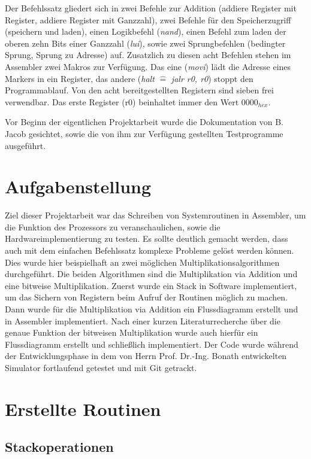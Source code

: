 \documentclass[fleqn, a4paper, 1pt]{article}       %
\begin{document}
Der Befehlssatz gliedert sich in zwei Befehle zur Addition (addiere Register mit Register, addiere Register mit Ganzzahl), zwei Befehle für den Speicherzugriff (speichern und laden), einen Logikbefehl (\emph{nand}), einen Befehl zum laden der oberen zehn Bits einer Ganzzahl (\emph{lui}), sowie zwei Sprungbefehlen (bedingter Sprung, Sprung zu Adresse) auf. Zusatzlich zu diesen acht Befehlen stehen im Assembler zwei Makros zur Verfügung. Das eine (\emph{movi}) lädt die Adresse eines Markers in ein Register, das andere (\emph{halt} $\widehat{=}$ \emph{jalr r0, r0}) stoppt den Programmablauf. Von den acht bereitgestellten Registern sind sieben frei verwendbar. Das erste Register (r0) beinhaltet immer den Wert $0000_{hex}$.

Vor Beginn der eigentlichen Projektarbeit wurde die Dokumentation von B. Jacob gesichtet, sowie die von ihm zur Verfügung gestellten Testprogramme ausgeführt.


\section{Aufgabenstellung}
Ziel dieser Projektarbeit war das Schreiben von Systemroutinen in Assembler, um die Funktion des Prozessors zu veranschaulichen, sowie die Hardwareimplementierung zu testen. Es sollte deutlich gemacht werden, dass auch mit dem einfachen Befehlssatz komplexe Probleme gelöst werden können. Dies wurde hier beispielhaft an zwei möglichen Multiplikationsalgorithmen durchgeführt. Die beiden Algorithmen sind die Multiplikation via Addition und eine bitweise Multiplikation. Zuerst wurde ein Stack in Software implementiert, um das Sichern von Registern beim Aufruf der Routinen möglich zu machen. Dann wurde für die Multiplikation via Addition ein Flussdiagramm erstellt und in Assembler implementiert. Nach einer kurzen Literaturrecherche über die genaue Funktion der bitweisen Multiplikation wurde auch hierfür ein Flussdiagramm erstellt und schließlich implementiert. Der Code wurde während der Entwicklungsphase in dem von Herrn Prof. Dr.-Ing. Bonath entwickelten Simulator fortlaufend getestet und mit Git getrackt.

\section{Erstellte Routinen}
\subsection{Stackoperationen}
\end{document}
